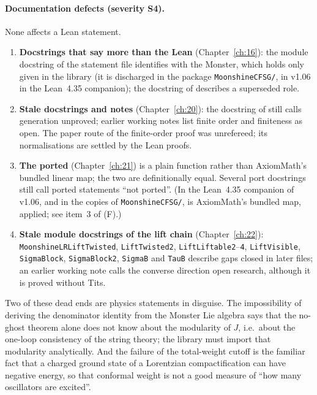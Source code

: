 \paragraph{Documentation defects (severity S4).} None affects a Lean statement.
\begin{enumerate}
\item \textbf{Docstrings that say more than the Lean} (Chapter~\ref{ch:16}): the module docstring of the statement file
  identifies  with the Monster, which holds only given  in the library (it is
  discharged in the package \texttt{MoonshineCFSG/}, in v1.06 in the Lean~4.35 companion); the docstring of
   describes a superseded role.
\item \textbf{Stale docstrings and notes} (Chapter~\ref{ch:20}): the docstring of 
  still calls generation unproved; earlier working notes list finite
  order and finiteness as open. The paper route of the finite-order proof was unrefereed; its normalisations are settled
  by the Lean proofs.
\item \textbf{The ported } (Chapter~\ref{ch:21}) is a plain function rather than AxiomMath's bundled linear map;
  the two are definitionally equal. Several port docstrings still call ported statements ``not ported''. (In the
  Lean~4.35 companion of v1.06, and in the copies of \texttt{MoonshineCFSG/},  is AxiomMath's bundled map,
  applied; see item~3 of (F).)
\item \textbf{Stale module docstrings of the lift chain} (Chapter~\ref{ch:22}): \texttt{MoonshineLRLiftTwisted},
  \texttt{LiftTwisted2}, \texttt{LiftLiftable2}--\texttt{4}, \texttt{LiftVisible}, \texttt{SigmaBlock},
  \texttt{SigmaBlock2}, \texttt{SigmaB} and \texttt{TauB} describe gaps closed in later files; an earlier working note
  calls the converse direction open research, although it is proved without Tits.
\end{enumerate}

\begin{physics}
Two of these dead ends are physics statements in disguise. The impossibility of deriving the denominator identity from the
Monster Lie algebra says that the no-ghost theorem alone does not know about the modularity of $J$, i.e.\ about the
one-loop consistency of the string theory; the library must import that modularity analytically. And the failure of the
total-weight cutoff is the familiar fact that a charged ground state of a Lorentzian compactification can have negative
energy, so that conformal weight is not a good measure of ``how many oscillators are excited''.
\end{physics}


